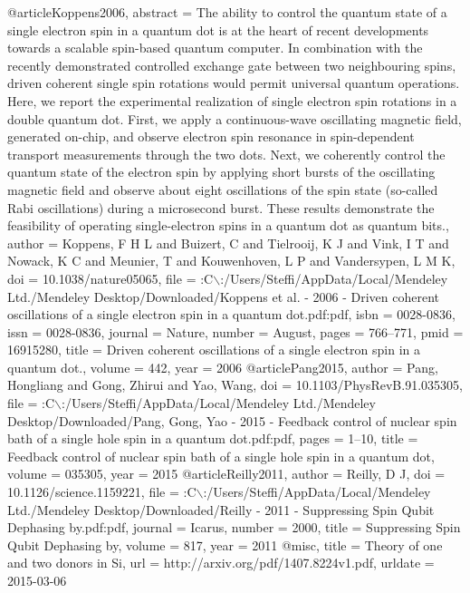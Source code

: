 @article{Koppens2006,
abstract = {The ability to control the quantum state of a single electron spin in a quantum dot is at the heart of recent developments towards a scalable spin-based quantum computer. In combination with the recently demonstrated controlled exchange gate between two neighbouring spins, driven coherent single spin rotations would permit universal quantum operations. Here, we report the experimental realization of single electron spin rotations in a double quantum dot. First, we apply a continuous-wave oscillating magnetic field, generated on-chip, and observe electron spin resonance in spin-dependent transport measurements through the two dots. Next, we coherently control the quantum state of the electron spin by applying short bursts of the oscillating magnetic field and observe about eight oscillations of the spin state (so-called Rabi oscillations) during a microsecond burst. These results demonstrate the feasibility of operating single-electron spins in a quantum dot as quantum bits.},
author = {Koppens, F H L and Buizert, C and Tielrooij, K J and Vink, I T and Nowack, K C and Meunier, T and Kouwenhoven, L P and Vandersypen, L M K},
doi = {10.1038/nature05065},
file = {:C$\backslash$:/Users/Steffi/AppData/Local/Mendeley Ltd./Mendeley Desktop/Downloaded/Koppens et al. - 2006 - Driven coherent oscillations of a single electron spin in a quantum dot.pdf:pdf},
isbn = {0028-0836},
issn = {0028-0836},
journal = {Nature},
number = {August},
pages = {766--771},
pmid = {16915280},
title = {{Driven coherent oscillations of a single electron spin in a quantum dot.}},
volume = {442},
year = {2006}
}
@article{Pang2015,
author = {Pang, Hongliang and Gong, Zhirui and Yao, Wang},
doi = {10.1103/PhysRevB.91.035305},
file = {:C$\backslash$:/Users/Steffi/AppData/Local/Mendeley Ltd./Mendeley Desktop/Downloaded/Pang, Gong, Yao - 2015 - Feedback control of nuclear spin bath of a single hole spin in a quantum dot.pdf:pdf},
pages = {1--10},
title = {{Feedback control of nuclear spin bath of a single hole spin in a quantum dot}},
volume = {035305},
year = {2015}
}
@article{Reilly2011,
author = {Reilly, D J},
doi = {10.1126/science.1159221},
file = {:C$\backslash$:/Users/Steffi/AppData/Local/Mendeley Ltd./Mendeley Desktop/Downloaded/Reilly - 2011 - Suppressing Spin Qubit Dephasing by.pdf:pdf},
journal = {Icarus},
number = {2000},
title = {{Suppressing Spin Qubit Dephasing by}},
volume = {817},
year = {2011}
}
@misc{,
title = {{Theory of one and two donors in Si}},
url = {http://arxiv.org/pdf/1407.8224v1.pdf},
urldate = {2015-03-06}
}
